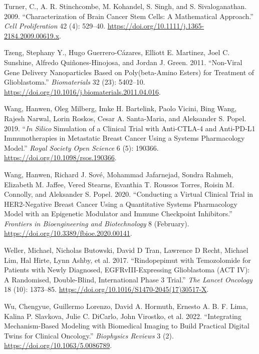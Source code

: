 \documentclass[
  default,
]{sn-jnl}
\newlength{\cslhangindent}
\newenvironment{CSLReferences}[2] %
 {\begin{list}{}{%
  \setlength{\itemindent}{0pt}
  \setlength{\leftmargin}{0pt}
  \setlength{\parsep}{0pt}
  \ifodd #1
   \setlength{\leftmargin}{\cslhangindent}
   \setlength{\itemindent}{-1\cslhangindent}
  \fi
  \setlength{\itemsep}{#2\baselineskip}}}
 {\end{list}}
\begin{document}
\begin{CSLReferences}{1}{0}
Turner, C., A. R. Stinchcombe, M. Kohandel, S. Singh, and S.
Sivaloganathan. 2009. {``Characterization of Brain Cancer Stem Cells: A
Mathematical Approach.''} \emph{Cell Proliferation} 42 (4): 529--40.
\url{https://doi.org/10.1111/j.1365-2184.2009.00619.x}.

Tzeng, Stephany Y., Hugo Guerrero-Cázares, Elliott E. Martinez, Joel C.
Sunshine, Alfredo Quiñones-Hinojosa, and Jordan J. Green. 2011.
{``Non-Viral Gene Delivery Nanoparticles Based on Poly(beta-Amino
Esters) for Treatment of Glioblastoma.''} \emph{Biomaterials} 32 (23):
5402--10. \url{https://doi.org/10.1016/j.biomaterials.2011.04.016}.

Wang, Hanwen, Oleg Milberg, Imke H. Bartelink, Paolo Vicini, Bing Wang,
Rajesh Narwal, Lorin Roskos, Cesar A. Santa-Maria, and Aleksander S.
Popel. 2019. {``{\emph{In Silico}} Simulation of a Clinical Trial with
Anti-CTLA-4 and Anti-PD-L1 Immunotherapies in Metastatic Breast Cancer
Using a Systems Pharmacology Model.''} \emph{Royal Society Open Science}
6 (5): 190366. \url{https://doi.org/10.1098/rsos.190366}.

Wang, Hanwen, Richard J. Sové, Mohammad Jafarnejad, Sondra Rahmeh,
Elizabeth M. Jaffee, Vered Stearns, Evanthia T. Roussos Torres, Roisin
M. Connolly, and Aleksander S. Popel. 2020. {``Conducting a Virtual
Clinical Trial in HER2-Negative Breast Cancer Using a Quantitative
Systems Pharmacology Model with an Epigenetic Modulator and Immune
Checkpoint Inhibitors.''} \emph{Frontiers in Bioengineering and
Biotechnology} 8 (February).
\url{https://doi.org/10.3389/fbioe.2020.00141}.

Weller, Michael, Nicholas Butowski, David D Tran, Lawrence D Recht,
Michael Lim, Hal Hirte, Lynn Ashby, et al. 2017. {``Rindopepimut with
Temozolomide for Patients with Newly Diagnosed, EGFRvIII-Expressing
Glioblastoma (ACT IV): A Randomised, Double-Blind, International Phase 3
Trial.''} \emph{The Lancet Oncology} 18 (10): 1373--85.
\url{https://doi.org/10.1016/S1470-2045(17)30517-X}.

Wu, Chengyue, Guillermo Lorenzo, David A. Hormuth, Ernesto A. B. F.
Lima, Kalina P. Slavkova, Julie C. DiCarlo, John Virostko, et al. 2022.
{``Integrating Mechanism-Based Modeling with Biomedical Imaging to Build
Practical Digital Twins for Clinical Oncology.''} \emph{Biophysics
Reviews} 3 (2). \url{https://doi.org/10.1063/5.0086789}.


\end{CSLReferences}
\end{document}

